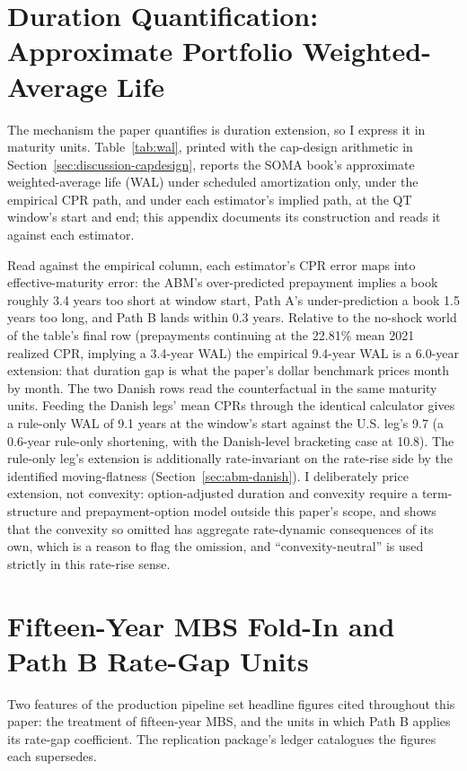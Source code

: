 \documentclass[12pt]{article}
\begin{document}
\section{Duration Quantification: Approximate Portfolio Weighted-Average Life}\label{sec:robustness-wal}

The mechanism the paper quantifies is duration extension, so I express it in maturity units. Table~\ref{tab:wal}, printed with the cap-design arithmetic in Section~\ref{sec:discussion-capdesign}, reports the SOMA book's approximate weighted-average life (WAL) under scheduled amortization only, under the empirical CPR path, and under each estimator's implied path, at the QT window's start and end; this appendix documents its construction and reads it against each estimator.

Read against the empirical column, each estimator's CPR error maps into effective-maturity error: the ABM's over-predicted prepayment implies a book roughly 3.4 years too short at window start, Path A's under-prediction a book 1.5 years too long, and Path B lands within 0.3 years. Relative to the no-shock world of the table's final row (prepayments continuing at the 22.81\% mean 2021 realized CPR, implying a 3.4-year WAL) the empirical 9.4-year WAL is a 6.0-year extension: that duration gap is what the paper's dollar benchmark prices month by month. The two Danish rows read the counterfactual in the same maturity units. Feeding the Danish legs' mean CPRs through the identical calculator gives a rule-only WAL of 9.1 years at the window's start against the U.S. leg's 9.7 (a 0.6-year rule-only shortening, with the Danish-level bracketing case at 10.8). The rule-only leg's extension is additionally rate-invariant on the rate-rise side by the identified moving-flatness (Section~\ref{sec:abm-danish}). I deliberately price extension, not convexity: option-adjusted duration and convexity require a term-structure and prepayment-option model outside this paper's scope, and \citet{hanson2014} shows that the convexity so omitted has aggregate rate-dynamic consequences of its own, which is a reason to flag the omission, and ``convexity-neutral'' is used strictly in this rate-rise sense.

\section{Fifteen-Year MBS Fold-In and Path B Rate-Gap Units}\label{sec:robustness-pipeline}

Two features of the production pipeline set headline figures cited throughout this paper: the treatment of fifteen-year MBS, and the units in which Path B applies its rate-gap coefficient. The replication package's ledger catalogues the figures each supersedes.
\end{document}
